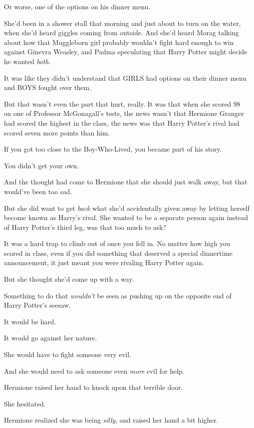 Or worse, one of the options on his dinner menu.

She'd been in a shower stall that morning and just about to turn on the water, when she'd heard giggles coming from outside. And she'd heard Morag talking about how that Muggleborn girl probably wouldn't fight hard enough to win against Ginevra Weasley, and Padma speculating that Harry Potter might decide he wanted \emph{both}.

It was like they didn't understand that GIRLS had options on their dinner menu and BOYS fought over them.

But that wasn't even the part that hurt, really. It was that when she scored 98 on one of Professor McGonagall's tests, the news wasn't that Hermione Granger had scored the highest in the class, the news was that Harry Potter's rival had scored seven more points than him.

If you got too close to the Boy-Who-Lived, you became part of his story.

You didn't get your own.

And the thought had come to Hermione that she should just walk away, but that would've been too sad.

But she did want to get \emph{back} what she'd accidentally given away by letting herself become known as Harry's rival. She wanted to be a separate person again instead of Harry Potter's third leg, was that too much to ask?

It was a hard trap to climb out of once you fell in. No matter how high you scored in class, even if you did something that deserved a special dinnertime announcement, it just meant you were rivaling Harry Potter again.

But she thought she'd come up with a way.

Something to do that \emph{wouldn't} be seen as pushing up on the opposite end of Harry Potter's seesaw.

It would be hard.

It would go against her nature.

She would have to fight someone very evil.

And she would need to ask someone even \emph{more} evil for help.

Hermione raised her hand to knock upon that terrible door.

She hesitated.

Hermione realized she was being \emph{silly}, and raised her hand a bit higher.


